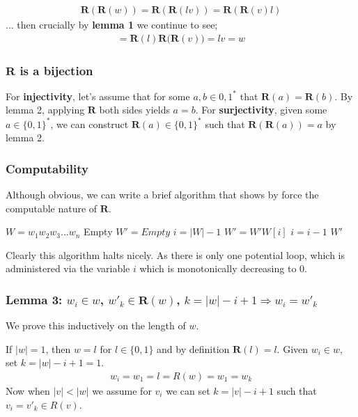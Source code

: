 \documentclass{article}
\begin{document}
\begin{align*}
	\bm{R}(\bm{R}(w)) = \bm{R}(\bm{R}(lv)) = \bm{R}(\bm{R}(v)l) 
\end{align*}
... then crucially by \textbf{lemma 1} we continue to see;
\begin{align*}
	= \bm{R}(l)\bm{R}\bigl(\bm{R}(v)\bigr) = lv = w
\end{align*}

\subsubsection*{$\bm{R}$ is a bijection}
For \textbf{injectivity}, let's assume that for some $a,b \in {0,1}^*$ that $\bm{R}(a) = \bm{R}(b)$. By lemma 2, applying $\bm{R}$ both sides yields $a = b$. For \textbf{surjectivity}, given some $a \in \{0,1\}^*$, we can construct $\bm{R}(a) \in \{0,1\}^*$ such that $\bm{R}(\bm{R}(a)) = a$ by lemma 2.

\subsubsection*{Computability}
Although obvious, we can write a brief algorithm that shows by force the computable nature of $\bm{R}$.

\begin{algorithmic}[1]
	\REQUIRE $W = w_1w_2w_3...w_n$
			\RETURN Empty 
	\ENDIF
	\STATE $W' = Empty$
	\STATE $i = |W| - 1$
		\STATE $W' = W'W[i]$
		\STATE $i = i - 1$
	\ENDWHILE
	\RETURN $W'$ 
\end{algorithmic}

Clearly this algorithm halts nicely. As there is only one potential loop, which is administered via the variable $i$ which is monotonically decreasing to 0.

\subsubsection*{Lemma 3: $w_i \in w$, $w'_k \in \bm{R}(w)$, $k=|w|-i+1 \Rightarrow w_i = w'_k$}
We prove this inductively on the length of $w$.

If $|w| = 1$, then $w = l$ for $l\in \{0,1\}$ and by definition $\bm{R}(l) = l$. Given $w_i \in w$, set $k=|w|-i+1=1$. 
\begin{align*}
w_i = w_1 = l = R(w) = w_1 = w_k
\end{align*}
Now when $|v| < |w|$ we assume for $v_i$ we can set $k=|v|-i+1$ such that $v_i = v'_k \in R(v)$.
\end{document}
